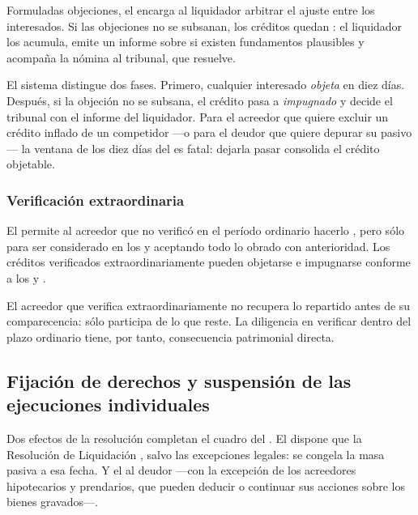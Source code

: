 Formuladas objeciones, el  encarga al liquidador arbitrar el ajuste entre los
interesados. Si las objeciones no se subsanan, los créditos quedan : el
liquidador los acumula, emite un informe sobre si existen fundamentos plausibles y acompaña la
nómina al tribunal, que resuelve.

\begin{foco}
El sistema distingue dos fases. Primero, cualquier interesado \emph{objeta} en diez días.
Después, si la objeción no se subsana, el crédito pasa a \emph{impugnado} y decide el tribunal
con el informe del liquidador. Para el acreedor que quiere excluir un crédito inflado de un
competidor ---o para el deudor que quiere depurar su pasivo--- la ventana de los diez días del
 es fatal: dejarla pasar consolida el crédito objetable.
\end{foco}

\subsubsection{Verificación extraordinaria}

El  permite al acreedor que no verificó en el período ordinario hacerlo
, pero sólo para ser
considerado en los  y aceptando todo lo obrado con anterioridad. Los
créditos verificados extraordinariamente pueden objetarse e impugnarse conforme a los 
y .

\begin{alerta}
El acreedor que verifica extraordinariamente no recupera lo repartido antes de su comparecencia:
sólo participa de lo que reste. La diligencia en verificar dentro del plazo ordinario tiene, por
tanto, consecuencia patrimonial directa.
\end{alerta}

\subsection{Fijación de derechos y suspensión de las ejecuciones individuales}

Dos efectos de la resolución completan el cuadro del \desasimiento{}. El  dispone que
la Resolución de Liquidación , salvo las excepciones
legales: se congela la masa pasiva a esa fecha. Y el   al deudor ---con la excepción de los acreedores
hipotecarios y prendarios, que pueden deducir o continuar sus acciones sobre los bienes
gravados---.


